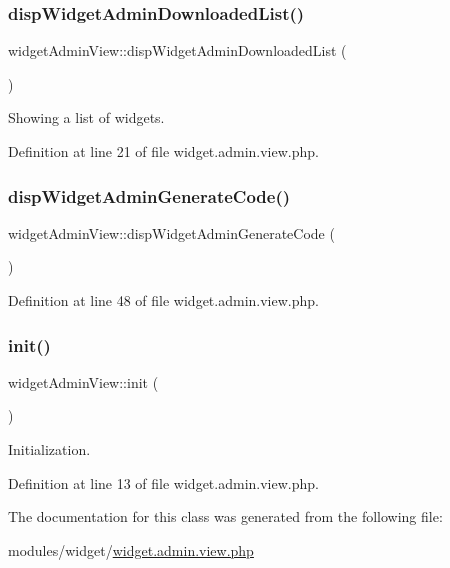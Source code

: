 \subsubsection{\texorpdfstring{disp\+Widget\+Admin\+Downloaded\+List()}{dispWidgetAdminDownloadedList()}}
{\footnotesize\ttfamily widget\+Admin\+View\+::disp\+Widget\+Admin\+Downloaded\+List (\begin{DoxyParamCaption}{ }\end{DoxyParamCaption})}



Showing a list of widgets. 



Definition at line 21 of file widget.\+admin.\+view.\+php.

\hypertarget{classwidgetAdminView_ad7ff38d629f723021518ac9ec7a88933}{}\label{classwidgetAdminView_ad7ff38d629f723021518ac9ec7a88933} 
\subsubsection{\texorpdfstring{disp\+Widget\+Admin\+Generate\+Code()}{dispWidgetAdminGenerateCode()}}
{\footnotesize\ttfamily widget\+Admin\+View\+::disp\+Widget\+Admin\+Generate\+Code (\begin{DoxyParamCaption}{ }\end{DoxyParamCaption})}



Definition at line 48 of file widget.\+admin.\+view.\+php.

\hypertarget{classwidgetAdminView_a6445179410099d3fa2b13a8e080d805b}{}\label{classwidgetAdminView_a6445179410099d3fa2b13a8e080d805b} 
\subsubsection{\texorpdfstring{init()}{init()}}
{\footnotesize\ttfamily widget\+Admin\+View\+::init (\begin{DoxyParamCaption}{ }\end{DoxyParamCaption})}



Initialization. 



Definition at line 13 of file widget.\+admin.\+view.\+php.



The documentation for this class was generated from the following file\+:\begin{DoxyCompactItemize}
\item 
modules/widget/\hyperlink{widget_8admin_8view_8php}{widget.\+admin.\+view.\+php}\end{DoxyCompactItemize}
